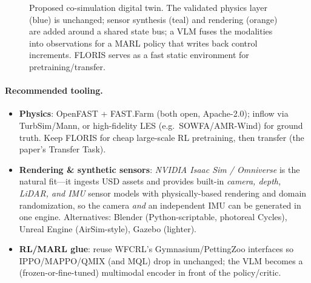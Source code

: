 \documentclass[11pt]{article}
\theoremstyle{plain}
\theoremstyle{definition}
\begin{document}
\begin{figure}[h]
\caption{Proposed co-simulation digital twin. The validated physics layer
(blue) is unchanged; sensor synthesis (teal) and rendering (orange) are added
around a shared state bus; a VLM fuses the modalities into observations for a
MARL policy that writes back control increments. FLORIS serves as a fast
static environment for pretraining/transfer.}
\label{fig:arch}
\end{figure}

\paragraph{Recommended tooling.}
\begin{itemize}[leftmargin=1.4em,itemsep=1pt]
  \item \textbf{Physics}: OpenFAST + FAST.Farm (both open, Apache-2.0);
  inflow via TurbSim/Mann, or high-fidelity LES (e.g.\ SOWFA/AMR-Wind) for
  ground truth. Keep FLORIS for cheap large-scale RL pretraining, then transfer
  (the paper's Transfer Task).
  \item \textbf{Rendering \& synthetic sensors}: \emph{NVIDIA Isaac Sim /
  Omniverse} is the natural fit---it ingests USD assets and provides built-in
  \emph{camera, depth, LiDAR, and IMU} sensor models with physically-based
  rendering and domain randomization, so the camera \emph{and} an independent
  IMU can be generated in one engine. Alternatives: Blender (Python-scriptable,
  photoreal Cycles), Unreal Engine (AirSim-style), Gazebo (lighter).
  \item \textbf{RL/MARL glue}: reuse WFCRL's Gymnasium/PettingZoo interfaces so
  IPPO/MAPPO/QMIX (and MQL) drop in unchanged; the VLM becomes a
  (frozen-or-fine-tuned) multimodal encoder in front of the policy/critic.
\end{itemize}
\end{document}
